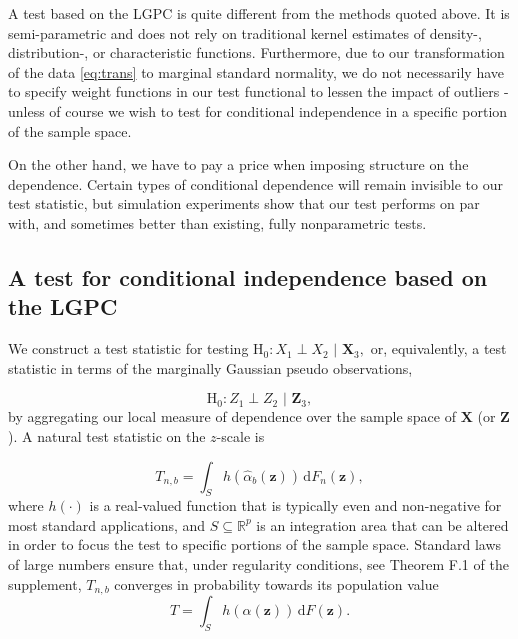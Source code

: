 \documentclass[
  12pt,
  letterpaper]{article}
\newcommand{\X}{\bm{X}}
\newcommand{\Z}{\bm{Z}}
\newcommand{\z}{\bm{z}}
\newcommand{\di}{\,\textrm{d}}
\theoremstyle{definition}
\theoremstyle{definition}
\theoremstyle{definition}
\theoremstyle{remark}
\begin{document}
A test based on the LGPC is quite different from the methods quoted above. It is semi-parametric and does not rely on traditional kernel estimates of density-, \mbox{distribution-,} or characteristic functions. Furthermore, due to our transformation of the data \eqref{eq:trans} to marginal standard normality, we do not necessarily have to specify weight functions in our test functional to lessen the impact of outliers - unless of course we wish to test for conditional independence in a specific portion of the sample space.

On the other hand, we have to pay a price when imposing structure on the dependence. Certain types of conditional dependence will remain invisible to our test statistic, but simulation experiments show that our test performs on par with, and sometimes better than existing, fully nonparametric tests.

\hypertarget{thetest}{%
\subsection{A test for conditional independence based on the LGPC}\label{thetest}}

We construct a test statistic for testing \(\textrm{H}_0: X_1 \perp X_2 \,\, | \,\, \X_3,\) or, equivalently, a test statistic in terms of the marginally Gaussian pseudo observations,

\begin{equation}
\textrm{H}_0: Z_1 \perp Z_2 \,\, | \,\, \Z_3,
\label{eq:ci-test}
\end{equation}
by aggregating our local measure of dependence over the sample space of \(\X\) (or \(\Z\)). A natural test statistic on the \(z\)-scale is

\begin{equation}
T_{n,b} = \int_S h\left( \widehat \alpha_b(\z)  \right) \di F_n(\z),
\label{eq:teststatistic}
\end{equation}
where \(h(\cdot)\) is a real-valued function that is typically even and non-negative for most standard applications, and \(S \subseteq \mathbb{R}^p\) is an integration area that can be altered in order to focus the test to specific portions of the sample space. Standard laws of large numbers ensure that, under regularity conditions, see Theorem F.1 of the supplement, \(T_{n,b}\) converges in probability towards its population value \[T = \int_S h\left(\alpha(\z)\right) \di F(\z).\]
\end{document}
